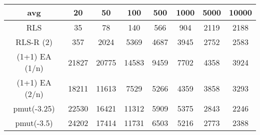 \begin{tabular}[h]{cccccccc}
avg&20&50&100&500&1000&5000&10000\\\hline
RLS&35&78&140&566&904&2119&2188\\
RLS-R (2)&357&2024&5369&4687&3945&2752&2583\\
(1+1) EA (1/n)&21827&20775&14583&9459&7702&4358&3924\\
(1+1) EA (2/n)&18211&11613&7529&5266&4359&3858&3293\\
pmut(-3.25)&22530&16421&11312&5909&5375&2843&2246\\
pmut(-3.5)&24202&17414&11731&6503&5216&2773&2388\\
\end{tabular}
